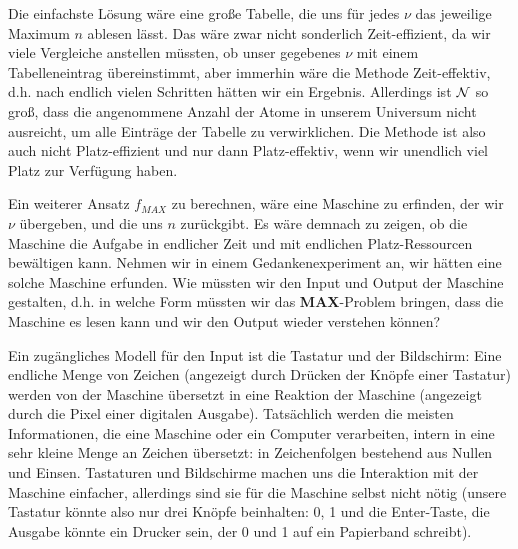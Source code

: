 Die einfachste Lösung wäre eine große Tabelle, die uns für jedes $\nu$
das jeweilige Maximum $n$ ablesen lässt.
Das wäre zwar nicht sonderlich Zeit-effizient,
da wir viele Vergleiche anstellen müssten,
ob unser gegebenes $\nu$ mit einem Tabelleneintrag übereinstimmt,
aber immerhin wäre die Methode Zeit-effektiv, 
d.h. nach endlich vielen Schritten hätten wir ein Ergebnis.
Allerdings ist $\cal{N}$ so groß,
dass die angenommene Anzahl der Atome in unserem Universum nicht ausreicht,
um alle Einträge der Tabelle zu verwirklichen.
Die Methode ist also auch nicht Platz-effizient und nur dann Platz-effektiv,
wenn wir unendlich viel Platz zur Verfügung haben.

Ein weiterer Ansatz $f_{MAX}$ zu berechnen,
wäre eine Maschine zu erfinden, der wir $\nu$ übergeben,
und die uns $n$ zurückgibt.
Es wäre demnach zu zeigen, ob die Maschine die Aufgabe in endlicher Zeit
und mit endlichen Platz-Ressourcen bewältigen kann.
Nehmen wir in einem Gedankenexperiment an, wir hätten eine solche Maschine erfunden.
Wie müssten wir den Input und Output der Maschine gestalten,
d.h. in welche Form müssten wir das \textbf{MAX}-Problem bringen,
dass die Maschine es lesen kann und wir den Output wieder verstehen können? 

Ein zugängliches Modell für den Input ist die Tastatur und der Bildschirm:
Eine endliche Menge von Zeichen (angezeigt durch Drücken der Knöpfe einer Tastatur)
werden von der Maschine übersetzt in eine Reaktion der Maschine 
(angezeigt durch die Pixel einer digitalen Ausgabe).
Tatsächlich werden die meisten Informationen,
die eine Maschine oder ein Computer verarbeiten,
intern in eine sehr kleine Menge an Zeichen übersetzt:
in Zeichenfolgen bestehend aus Nullen und Einsen.
Tastaturen und Bildschirme machen uns die Interaktion mit der Maschine einfacher,
allerdings sind sie für die Maschine selbst nicht nötig
(unsere Tastatur könnte also nur drei Knöpfe beinhalten: 0, 1 und die Enter-Taste,
die Ausgabe könnte ein Drucker sein, der 0 und 1 auf ein Papierband schreibt).


